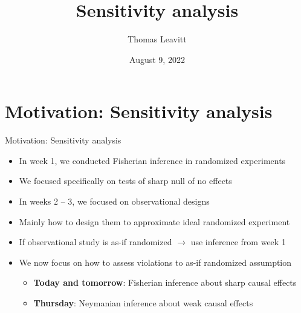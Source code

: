 \documentclass[table, xcolor={dvipsnames}, 9pt]{beamer}
\title[]{Sensitivity analysis} %
\author{Thomas Leavitt} %
\institute[] %
{
\medskip
\textit{} %
}
\date{August 9, 2022} %
\theoremstyle{newstyle}
\begin{document}
\begin{frame}
\titlepage %
\end{frame}


\section{Motivation: Sensitivity analysis}
\begin{frame}{Motivation: Sensitivity analysis}
\vfill
\begin{itemize} \vfill
\item In week 1, we conducted Fisherian inference in randomized experiments \vfill
\item[] We focused specifically on tests of sharp null of no effects \vfill
\item In weeks 2 -- 3, we focused on observational designs \vfill
\item[] Mainly how to design them to approximate ideal randomized experiment \vfill
\item[] If observational study is as-if randomized $\rightarrow$ use inference from week 1 \vfill
\item We now focus on how to assess violations to as-if randomized assumption \vfill
\begin{itemize} \vfill
\item \textbf{Today and tomorrow}: Fisherian inference about sharp causal effects \vfill
\item \textbf{Thursday}: Neymanian inference about weak causal effects \vfill
\end{itemize} \vfill
\end{itemize} \vfill
\end{frame}
\end{document}
